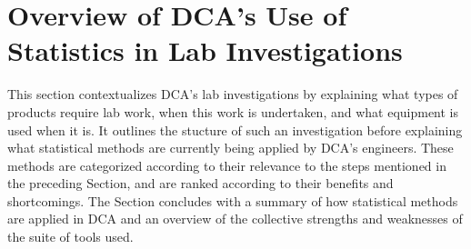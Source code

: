\documentclass[11pt,a4paper,article]{memoir} %
\begin{document}

\newpage



\chapter {Overview of DCA's Use of Statistics in Lab Investigations}

This section contextualizes DCA's lab investigations by explaining what types of products require lab work, when this work is undertaken, and what equipment is used when it is. It outlines the stucture of such an investigation before explaining what statistical methods are currently being applied by DCA's engineers. These methods are categorized according to their relevance to the steps mentioned in the preceding Section, and are ranked according to their benefits and shortcomings. The Section concludes with a summary of how statistical methods are applied in DCA and an overview of the collective strengths and weaknesses of the suite of tools used.
\end{document}
